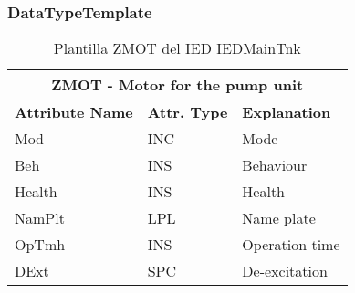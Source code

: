     \subsubsection{DataTypeTemplate}
    \begin{table}[H]
    \begin{center}
    \begin{tabular}{|l|l|p{8.5cm}|}
            \hline
            \multicolumn{3}{|c|}{\cellcolor[gray]{0.8} \textbf{ ZMOT}  - Motor for the pump unit} \\
            \hline
            \textbf{Attribute Name} & \textbf{Attr. Type} & \textbf{Explanation} \\
            \hline 
            Mod & INC & Mode \\
            \hline
            Beh & INS & Behaviour \\
            \hline
            Health & INS & Health \\
            \hline
            NamPlt & LPL & Name plate \\
            \hline
            OpTmh & INS & Operation time \\
            \hline
            DExt & SPC & De-excitation \\
            \hline
    \end{tabular}
    \caption{Plantilla ZMOT del IED IEDMainTnk}
    \label{table:lnTypeZMOTa}
    \end{center}
    \end{table}
    
    
    